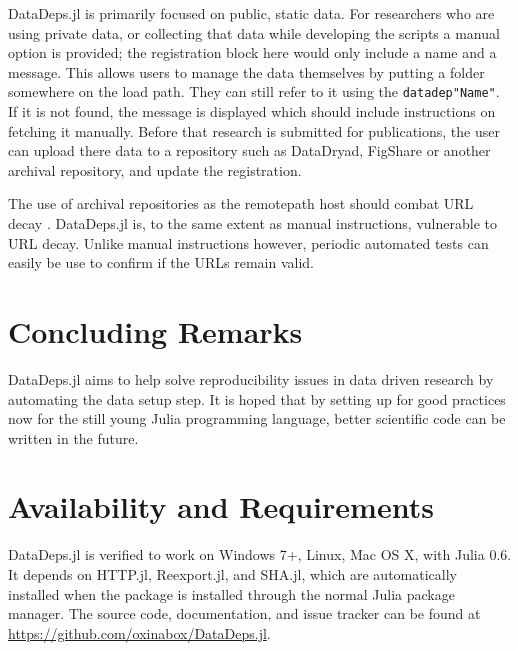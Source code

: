 \documentclass[twoside,11pt]{article}\usepackage{jmlr2e}
\newcommand{\datadep}[1]{\texttt{datadep"{}#1"{}}}
\begin{document}
DataDeps.jl is primarily focused on public, static data.
For researchers who are using private data, or collecting that data while developing the scripts a manual option is provided; the registration block here would only include a name and a message. This allows users to manage the data themselves by putting a folder somewhere on the load path. They can still refer to it using the \datadep{Name}. If it is not found, the message is displayed which should include instructions on fetching it manually.
Before that research is submitted for publications, the user can upload there data to a repository such as DataDryad, FigShare or another archival repository, and update the registration.

The use of archival repositories as the remotepath host should combat URL decay \citep{wren2008url}. DataDeps.jl is, to the same extent as manual instructions, vulnerable to URL decay.
Unlike manual instructions however, periodic automated tests can easily be use to confirm if the URLs remain valid.

\section {Concluding Remarks}
DataDeps.jl aims to help solve reproducibility issues in data driven research by automating the data setup step.
It is hoped that by setting up for good practices now for the still young Julia programming language, better scientific code can be written in the future.



\section{Availability and Requirements}
DataDeps.jl is verified to work on  Windows 7+, Linux, Mac OS X, with Julia 0.6.
It depends on HTTP.jl, Reexport.jl, and SHA.jl, which are automatically installed when the package is installed through the normal Julia package manager.
The source code, documentation, and issue tracker can be found at \url{https://github.com/oxinabox/DataDeps.jl}.

\vskip 0.2in

\end{document}
